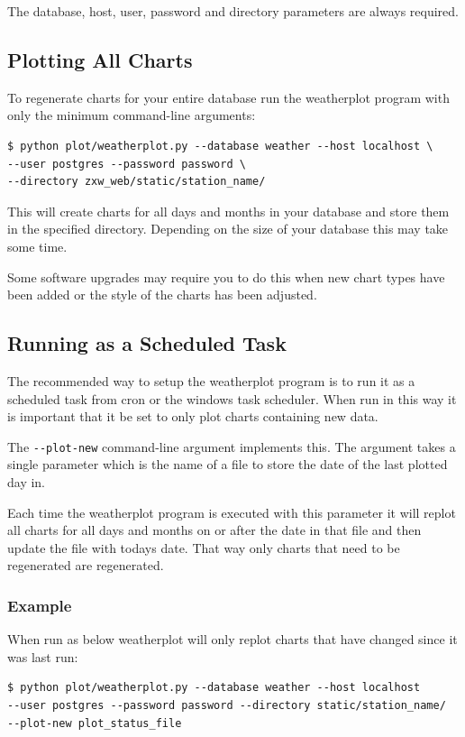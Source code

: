 \documentclass[a4paper,10pt,draft]{book}
\begin{document}
The database, host, user, password and directory parameters are always required.

\subsection{Plotting All Charts}

To regenerate charts for your entire database run the weatherplot program with only the minimum command-line arguments:

\begin{verbatim}
$ python plot/weatherplot.py --database weather --host localhost \
--user postgres --password password \
--directory zxw_web/static/station_name/
\end{verbatim}

This will create charts for all days and months in your database and store them in the specified directory. Depending on the size of your database this may take some time.

Some software upgrades may require you to do this when new chart types have been added or the style of the charts has been adjusted.

\subsection{Running as a Scheduled Task}

The recommended way to setup the weatherplot program is to run it as a scheduled task from cron or the windows task scheduler. When run in this way it is important that it be set to only plot charts containing new data.

The \verb|--plot-new| command-line argument implements this. The argument takes a single parameter which is the name of a file to store the date of the last plotted day in.

Each time the weatherplot program is executed with this parameter it will replot all charts for all days and months on or after the date in that file and then update the file with todays date. That way only charts that need to be regenerated are regenerated.

\subsubsection{Example}

When run as below weatherplot will only replot charts that have changed since it was last run:
\begin{verbatim}
$ python plot/weatherplot.py --database weather --host localhost
--user postgres --password password --directory static/station_name/
--plot-new plot_status_file
\end{verbatim}
\end{document}
